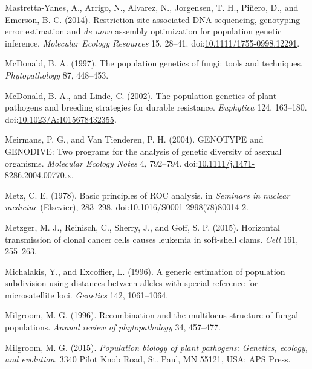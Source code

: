 \documentclass[double,12pt]{beavtex}
\begin{document}
  \hypertarget{ref-mastretta2015restriction}{}
  Mastretta-Yanes, A., Arrigo, N., Alvarez, N., Jorgensen, T. H., Piñero,
  D., and Emerson, B. C. (2014). Restriction site-associated DNA
  sequencing, genotyping error estimation and \emph{de novo} assembly
  optimization for population genetic inference. \emph{Molecular Ecology
  Resources} 15, 28--41.
  doi:\href{https://doi.org/10.1111/1755-0998.12291}{10.1111/1755-0998.12291}.
  
  \hypertarget{ref-mcdonald1997population}{}
  McDonald, B. A. (1997). The population genetics of fungi: tools and
  techniques. \emph{Phytopathology} 87, 448--453.
  
  \hypertarget{ref-Mcdonald2002}{}
  McDonald, B. A., and Linde, C. (2002). The population genetics of plant
  pathogens and breeding strategies for durable resistance.
  \emph{Euphytica} 124, 163--180.
  doi:\href{https://doi.org/10.1023/A:1015678432355}{10.1023/A:1015678432355}.
  
  \hypertarget{ref-meirmans2004genotype}{}
  Meirmans, P. G., and Van Tienderen, P. H. (2004). GENOTYPE and GENODIVE:
  Two programs for the analysis of genetic diversity of asexual organisms.
  \emph{Molecular Ecology Notes} 4, 792--794.
  doi:\href{https://doi.org/10.1111/j.1471-8286.2004.00770.x}{10.1111/j.1471-8286.2004.00770.x}.
  
  \hypertarget{ref-metz1978basic}{}
  Metz, C. E. (1978). Basic principles of ROC analysis. in \emph{Seminars
  in nuclear medicine} (Elsevier), 283--298.
  doi:\href{https://doi.org/10.1016/S0001-2998(78)80014-2}{10.1016/S0001-2998(78)80014-2}.
  
  \hypertarget{ref-metzger2015horizontal}{}
  Metzger, M. J., Reinisch, C., Sherry, J., and Goff, S. P. (2015).
  Horizontal transmission of clonal cancer cells causes leukemia in
  soft-shell clams. \emph{Cell} 161, 255--263.
  
  \hypertarget{ref-michalakis1996generic}{}
  Michalakis, Y., and Excoffier, L. (1996). A generic estimation of
  population subdivision using distances between alleles with special
  reference for microsatellite loci. \emph{Genetics} 142, 1061--1064.
  
  \hypertarget{ref-milgroom1996recombination}{}
  Milgroom, M. G. (1996). Recombination and the multilocus structure of
  fungal populations. \emph{Annual review of phytopathology} 34, 457--477.
  
  \hypertarget{ref-milgroom2015population}{}
  Milgroom, M. G. (2015). \emph{Population biology of plant pathogens:
  Genetics, ecology, and evolution}. 3340 Pilot Knob Road, St. Paul, MN
  55121, USA: APS Press.
  
\end{document}
